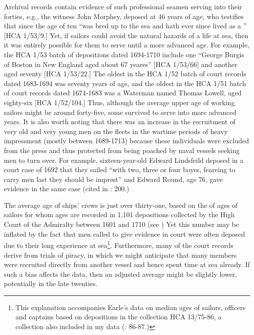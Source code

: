 Archival records contain evidence of such professional seamen serving into their forties, e.g., the witness John Morphey, deposed at 46 years of age, who testifies that since the age of ten “was bred up to the sea and hath ever since lived as a ” [HCA 1/53/9.] Yet, if sailors could avoid the natural hazards of a life at sea, then it was entirely possible for them to serve until a more advanced age. For example, the HCA 1/53 batch of depositions dated 1694-1710 include one  “George Burgis of Boston in New England  aged about 67 yeares” [HCA 1/53/66] and another aged seventy [HCA 1/53/22.] The oldest  in the HCA 1/52 batch of court records dated 1683-1694 was seventy years of age, and the oldest  in the HCA 1/51 batch of court records dated 1674-1683 was a Waterman named Thomas Lowell, aged eighty-six [HCA 1/52/104.] Thus, although the average upper age of working sailors might be around forty-five, some survived to serve into more advanced years. It is also worth noting that there was an increase in the recruitment of very old and very young men on the  fleets in the wartime periods of heavy impressment (mostly between 1689-1713) because these individuals were excluded from the press and thus protected from being poached by naval vessels seeking men to turn over. For example, sixteen-year-old Edward Lindsfeild deposed in a court case of 1692 that they sailed “with two, three or four boyes, feareing to carry men last they should be imprest” and Edward Round, age 76, gave evidence in the same case (cited in \citealt{Earle1998}: 200.) 

 The average age of ships’ crews is just over thirty-one, based on the of ages of sailors for whom ages are recorded in 1,101 depositions collected by the High Court of the Admiralty between 1601 and 1710 (see ) Yet this number may be inflated by the fact that men called to give evidence in court were often deposed due to their long experience at sea\footnote{This explanation accompanies Earle’s data on median ages of sailors, officers and captains based on depositions in the collection HCA 13/75-86, a collection also included in my data (\citealt{Earle1993}: 86-87.)}. Furthermore, many of the court records derive from trials of piracy, in which we might anticipate that many  members were recruited directly from another vessel and hence spent time at sea already. If such a bias affects the data, then an adjusted average might be slightly lower, potentially in the late twenties.

